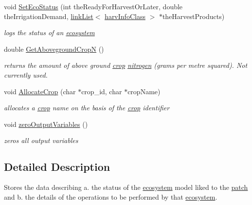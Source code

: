 \begin{DoxyCompactItemize}
void \hyperlink{classpatch_interface_class_a277f24bc24c945c48b8bd0982c74bdcd}{SetEcoStatus} (int theReadyForHarvestOrLater, double theIrrigationDemand, \hyperlink{classlink_list}{linkList}$<$ \hyperlink{classharv_info_class}{harvInfoClass} $>$ $\ast$theHarvestProducts)
\begin{DoxyCompactList}\small\item\em logs the status of an \hyperlink{classecosystem}{ecosystem} \item\end{DoxyCompactList}\item 
double \hyperlink{classpatch_interface_class_a14e6aed7da3189e045f0ed4e6b0afbad}{GetAbovegroundCropN} ()
\begin{DoxyCompactList}\small\item\em returns the amount of above ground \hyperlink{classcrop}{crop} \hyperlink{classnitrogen}{nitrogen} (grams per metre squared). Not currently used. \item\end{DoxyCompactList}\item 
void \hyperlink{classpatch_interface_class_ae02323c3035b9b3e282b937a77771862}{AllocateCrop} (char $\ast$crop\_\-id, char $\ast$cropName)
\begin{DoxyCompactList}\small\item\em allocates a \hyperlink{classcrop}{crop} name on the basis of the \hyperlink{classcrop}{crop} identifier \item\end{DoxyCompactList}\item 
void \hyperlink{classpatch_interface_class_a5ba5cbe194b9e76f7dab382e1504be39}{zeroOutputVariables} ()
\begin{DoxyCompactList}\small\item\em zeros all output variables \item\end{DoxyCompactList}\end{DoxyCompactItemize}


\subsection{Detailed Description}
Stores the data describing a. the status of the \hyperlink{classecosystem}{ecosystem} model liked to the \hyperlink{classpatch}{patch} and b. the details of the operations to be performed by that \hyperlink{classecosystem}{ecosystem}. 

